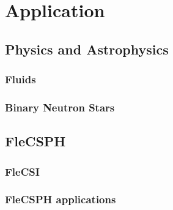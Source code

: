 \part{Application}

\chapter{Physics and Astrophysics}

\section{Fluids}
\section{Binary Neutron Stars}

\chapter{FleCSPH}

\section{FleCSI}
\section{FleCSPH applications}